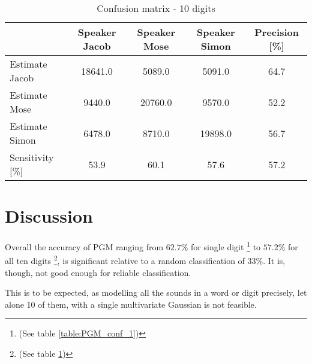 \begin{table}[H]                                                    
\centering                                                          
\begin{tabular}{|l|c|c|c|c|}                                        
\hline                                                              
  & Speaker Jacob & Speaker Mose & Speaker Simon & Precision [\%] \\
\hline                                                              
Estimate Jacob & 18641.0 & 5089.0 & 5091.0 & 64.7 \\                
\hline                                                              
Estimate Mose & 9440.0 & 20760.0 & 9570.0 & 52.2 \\                 
\hline                                                              
Estimate Simon & 6478.0 & 8710.0 & 19898.0 & 56.7 \\                
\hline                                                              
Sensitivity [\%] & 53.9 & 60.1 & 57.6 & 57.2 \\                     
\hline                                                              
\end{tabular}                                                       
\caption{Confusion matrix - 10 digits}                              
\label{table:PGM_conf_10}                                           
\end{table}

\section{Discussion}
Overall the accuracy of PGM ranging from $ 62.7 \% $ for single digit 
\footnote{(See table \ref{table:PGM_conf_1})} 
to $ 57.2 \% $ for all ten digits
\footnote{(See table \ref{table:PGM_conf_10})}, is significant relative to a random classification of $ 33 \% $.
It is, though, not good enough for reliable classification. 

This is to be expected, as modelling all the sounds in a word or digit precisely, let alone 10 of them, with a single multivariate Gaussian is not feasible.

 


